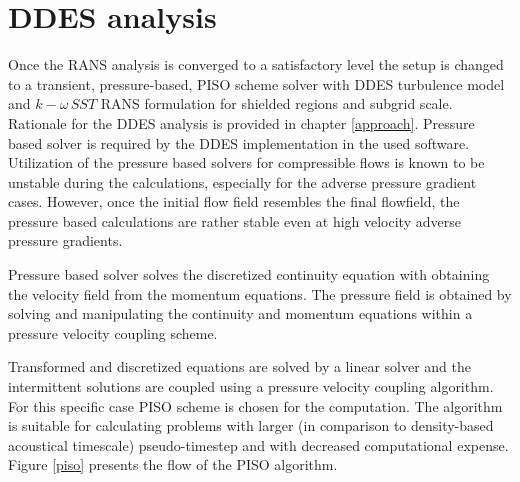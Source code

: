 \section{DDES analysis}
Once the RANS analysis is converged to a satisfactory level the setup is changed to a transient, pressure-based, PISO scheme solver with DDES turbulence model and $k-\omega \, SST$ RANS formulation for shielded regions and subgrid scale. Rationale for the DDES analysis is provided in chapter \ref{approach}. Pressure based solver is required by the DDES implementation in the used software. Utilization of the pressure based solvers for compressible flows is known to be unstable during the calculations, especially for the adverse pressure gradient cases. However, once the initial flow field resembles the final flowfield, the pressure based calculations are rather stable even at high velocity adverse pressure gradients.

Pressure based solver solves the discretized continuity equation with obtaining the velocity field from the momentum equations. The pressure field is obtained by solving and manipulating the continuity and momentum equations within a pressure velocity coupling scheme.

%
%

Transformed and discretized equations are solved by a linear solver and the intermittent solutions are coupled using a pressure velocity coupling algorithm. For this specific case PISO scheme is chosen for the computation. The algorithm is suitable for calculating problems with larger (in comparison to density-based acoustical timescale) pseudo-timestep and with decreased computational expense. Figure \ref{piso} presents the flow of the PISO algorithm. 


